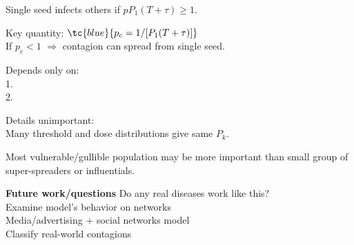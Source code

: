   Single seed infects others if $p P_1 (T + \tau) \ge 1$.

  Key quantity: $\tc{blue}{p_c = 1/[P_1 (T + \tau)]}$\\

  If $p_c < 1$ $\Rightarrow$ contagion can spread from single seed.
  
  Depends only on:\\
  1. \\
  2. 

  Details unimportant:\\
  Many threshold and dose distributions give same $P_k$.

   Most vulnerable/gullible population may be more important than
  small group of super-spreaders or influentials.


  \textbf{Future work/questions}
   Do any real diseases work like this?\\
  \mbox{}\newline
   Examine model's behavior on networks\\
  \mbox{}\newline
   Media/advertising + social networks model\\
  \mbox{}\newline
   Classify real-world contagions



